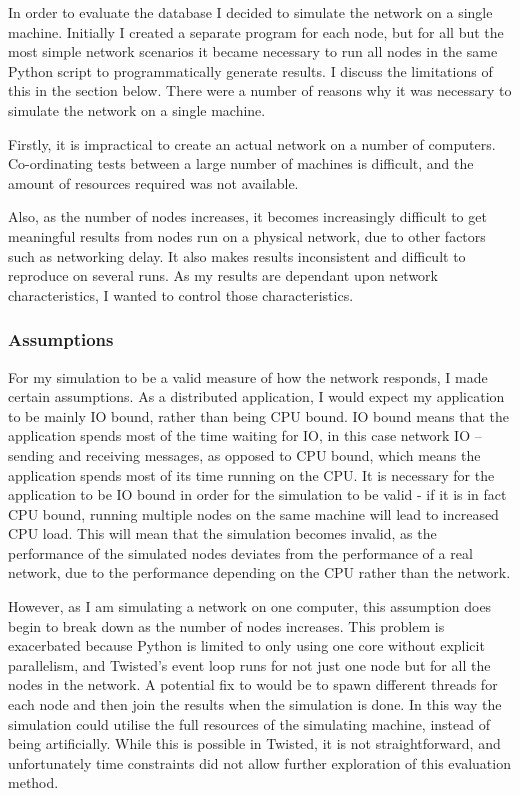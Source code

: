 \documentclass[12pt,twoside,notitlepage]{report}
\begin{document}
In order to evaluate the database I decided to simulate the network on a single machine. Initially
I created a separate program for each node, but for all but the most simple network scenarios it
became necessary to run all nodes in the same Python script to programmatically generate results.
I discuss the limitations of this in the section below. There were a number of reasons why it was
necessary to simulate the network on a single machine.

Firstly, it is impractical to create an actual network on a number of computers. Co-ordinating
tests between a large number of machines is difficult, and the amount of resources required was
not available.

Also, as the number of nodes increases, it becomes increasingly difficult to get meaningful
results from nodes run on a physical network, due to other factors such as networking delay. It
also makes results inconsistent and difficult to reproduce on several runs. As my results are
dependant upon network characteristics, I wanted to control those characteristics.

\subsubsection*{Assumptions}

For my simulation to be a valid measure of how the network responds, I made certain assumptions.
As a distributed application, I would expect my application to be mainly IO bound, rather than
being CPU bound. IO bound means that the application spends most of the time waiting for IO, in
this case network IO -- sending and receiving messages, as opposed to CPU bound, which means the
application spends most of its time running on the CPU. It is necessary for the application to be
IO bound in order for the simulation to be valid - if it is in fact CPU bound, running multiple
nodes on the same machine will lead to increased CPU load. This will mean that the simulation
becomes invalid, as the performance of the simulated nodes deviates from the performance of a real
network, due to the performance depending on the CPU rather than the network.

However, as I am simulating a network on one computer, this assumption does begin to
break down as the number of nodes increases. This problem is exacerbated because Python is
limited to only using one core without explicit parallelism, and Twisted's event loop runs
for not just one node but for all the nodes in the network. A potential fix to would be to spawn
different threads for each node and then join the results when the simulation is done. In this way
the simulation could utilise the full resources of the simulating machine, instead of being
artificially. While this is possible in Twisted, it is not straightforward, and unfortunately time
constraints did not allow further exploration of this evaluation method.
\end{document}
